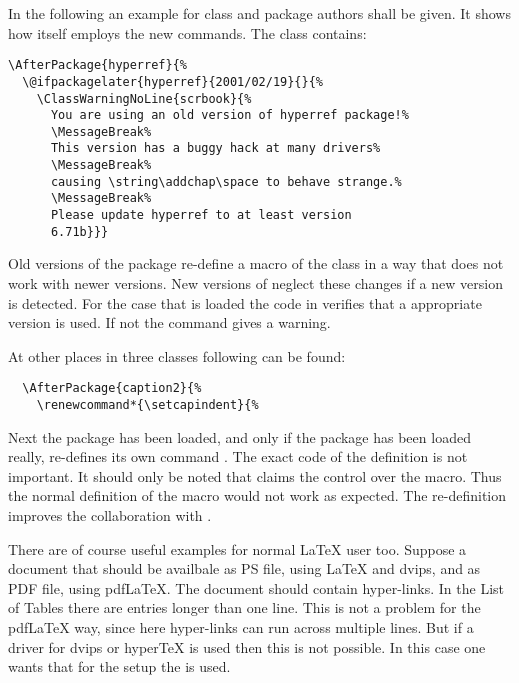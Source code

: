 \begin{Example}
  In the following an example for class and package authors
  shall be given.
  It shows how \KOMAScript{} itself employs the new commands.
  The class  contains:
\begin{lstlisting}
\AfterPackage{hyperref}{%
  \@ifpackagelater{hyperref}{2001/02/19}{}{%
    \ClassWarningNoLine{scrbook}{%
      You are using an old version of hyperref package!%
      \MessageBreak%
      This version has a buggy hack at many drivers%
      \MessageBreak%
      causing \string\addchap\space to behave strange.%
      \MessageBreak%
      Please update hyperref to at least version
      6.71b}}}
\end{lstlisting}
  Old versions of the  package re-define
  a macro of the  class in a way that does not
  work with newer \KOMAScript{} versions.
  New versions of  neglect these changes
  if a new \KOMAScript{} version is detected.
  For the case that  is loaded the code
  in  verifies that a appropriate
   version is used.   If not the command gives
  a warning.

  At other places in three \KOMAScript{} classes following can be found:
\begin{lstlisting}
  \AfterPackage{caption2}{%
    \renewcommand*{\setcapindent}{%
\end{lstlisting}
  Next the package  has been loaded, and only
  if the package has been loaded really, \KOMAScript{} re-defines
  its own command .
  The exact code of the definition is not important.
  It should only be noted that  claims the
  control over the  macro.
  Thus the normal definition of the  macro
  would not work as expected.
  The re-definition improves the collaboration with .

  There are of course useful examples for normal \LaTeX{} user too.
  Suppose a document that should be availbale as PS file, using
  LaTeX{} and dvips, and as PDF file, using pdf\LaTeX.
  The document should contain hyper-links.
  In the List of Tables there are entries longer than one line.
  This is not a problem for the pdf\LaTeX{} way, since here
  hyper-links can run across multiple lines.  
  But if a  driver for dvips or
  hyper\TeX{} is used then this is not possible.
  In this case one wants that for the  setup
  the  is used.
  

\end{Example}
